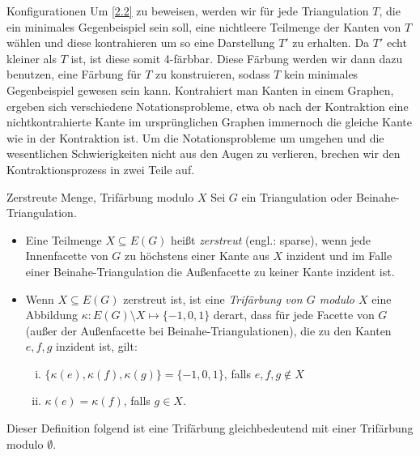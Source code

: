 \begin{section}{Konfigurationen}
 Um \ref{2.2} zu beweisen, werden wir für jede Triangulation $T$, die ein minimales Gegenbeispiel sein soll, eine nichtleere Teilmenge der Kanten von $T$ wählen und diese kontrahieren um so eine Darstellung $T'$ zu erhalten. Da $T'$ echt kleiner als $T$ ist, ist diese somit 4-färbbar. Diese Färbung werden wir dann dazu benutzen, eine Färbung für $T$ zu konstruieren, sodass $T$ kein minimales Gegenbeispiel gewesen sein kann. Kontrahiert man Kanten in einem Graphen, ergeben sich verschiedene Notationsprobleme, etwa ob nach der Kontraktion eine nichtkontrahierte Kante im ursprünglichen Graphen immernoch die gleiche Kante wie in der Kontraktion ist. Um die Notationsprobleme um umgehen und die wesentlichen Schwierigkeiten nicht aus den Augen zu verlieren, brechen wir den Kontraktionsprozess in zwei Teile auf. 
 
 \begin{definition}{Zerstreute Menge, Trifärbung modulo $X$}
 Sei $G$ ein Triangulation oder Beinahe-Triangulation. 
 \begin{itemize}
  \item Eine Teilmenge $X \subseteq E(G)$ heißt \textit{zerstreut} (engl.: sparse), wenn jede Innenfacette von $G$ zu höchstens einer Kante aus $X$ inzident und im Falle einer Beinahe-Triangulation die Außenfacette zu keiner Kante inzident ist.
  \item Wenn $X \subseteq E(G)$ zerstreut ist, ist eine \textit{Trifärbung von $G$ modulo $X$} eine Abbildung $\kappa: E(G) \setminus X \mapsto \{-1,0,1\}$ derart, dass für jede Facette von $G$ (außer der Außenfacette bei Beinahe-Triangulationen), die zu den Kanten $e,f,g$ inzident ist, gilt:
  \begin{enumerate}[(i)]
   \item $\{\kappa(e),\kappa(f),\kappa(g)\} = \{-1,0,1\}$, falls $e,f,g \not\in X$
   \item $\kappa(e) = \kappa(f)$, falls $g\in X$.
  \end{enumerate}
 \end{itemize}
 \end{definition}
 
 Dieser Definition folgend ist eine Trifärbung gleichbedeutend mit einer Trifärbung modulo $\emptyset$. 
 

\end{section}
